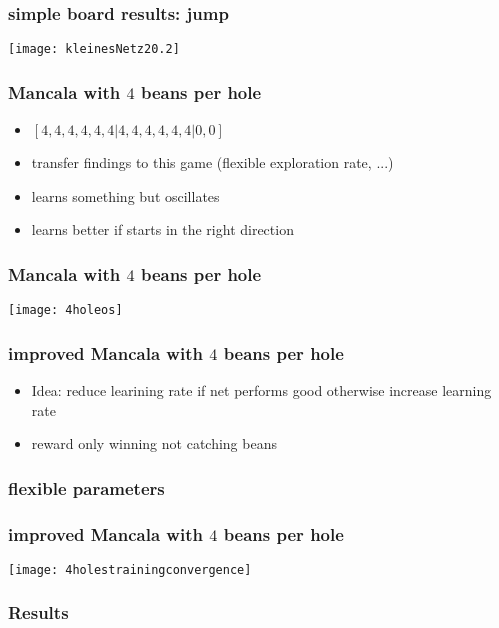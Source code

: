 \documentclass{beamer}
\begin{document}
 \begin{frame}
 \frametitle{simple board results: jump}
 \texttt{[image: kleinesNetz20.2]}
 \end{frame}

 \begin{frame}
 \frametitle{Mancala with $4$ beans per hole}
 \begin{itemize}
\item  $[4,4,4,4,4,4|4,4,4,4,4,4|0,0]$
\item transfer findings to this game (flexible exploration rate, ...)
\item learns something but oscillates 
\item  learns better if starts in the right direction
\end{itemize}
 \end{frame}

 \begin{frame}
 \frametitle{Mancala with $4$ beans per hole}
 \texttt{[image: 4holeos]}
 \end{frame}

\begin{frame}
\frametitle{improved Mancala with $4$ beans per hole}
\begin{itemize}
\item Idea: reduce learining rate if net performs good otherwise increase learning rate
\item reward only winning not catching beans
\end{itemize}
\end{frame}

\begin{frame}
\frametitle{flexible parameters}

\end{frame}

 \begin{frame}
\frametitle{improved Mancala with $4$ beans per hole}
 \texttt{[image: 4holestrainingconvergence]}
 \end{frame}

\begin{frame} 
\frametitle{Results}
\end{frame}
\end{document}
